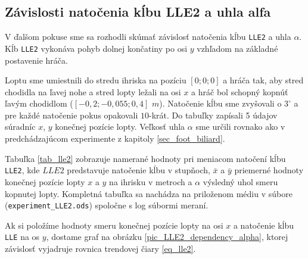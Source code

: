 \subsection{Závislosti natočenia kĺbu LLE2 a uhla alfa} \label{sec_lle2}
V ďalšom pokuse sme sa rozhodli skúmať závislosť natočenia kĺbu \texttt{LLE2} a uhla $\alpha$. Kĺb \texttt{LLE2} vykonáva pohyb dolnej končatiny po osi $y$ vzhľadom na základné postavenie hráča. 

Loptu sme umiestnili do stredu ihriska na pozíciu $[0;0;0]$ a hráča tak, aby stred chodidla na ľavej nohe a stred lopty ležali na osi $x$ a hráč bol schopný kopnúť ľavým chodidlom ($[-0,2; -0,055; 0,4]$ $m$). Natočenie kĺbu sme zvyšovali o $3^{\circ}$ a pre každé natočenie pokus opakovali $10$-krát. Do tabuľky zapísali 5 údajov súradníc $x$, $y$ konečnej pozície lopty. Veľkosť uhla $\alpha$ sme určili rovnako ako v predchádzajúcom experimente z kapitoly \ref{sec_foot_biliard}. 

Tabuľka \ref{tab_lle2} zobrazuje namerané hodnoty pri meniacom natočení kĺbu \texttt{LLE2}, kde $LLE2$ predstavuje natočenie kĺbu v stupňoch, $\bar{x}$ a $\bar{y}$ priemerné hodnoty konečnej pozície lopty $x$ a $y$ na ihrisku v metroch a $\alpha$ výsledný uhol smeru kopnutej lopty. Kompletná tabuľka sa nachádza na priloženom médiu v súbore (\texttt{experiment\_LLE2.ods}) spoločne s log súbormi meraní.

Ak si položíme hodnoty smeru konečnej pozície lopty na osi $x$ a natočenie kĺbu \texttt{LLE} na os $y$, dostame graf na obrázku \ref{pic_LLE2_dependency_alpha}, ktorej závislosť vyjadruje rovnica trendovej čiary \ref{eq_lle2}. 

